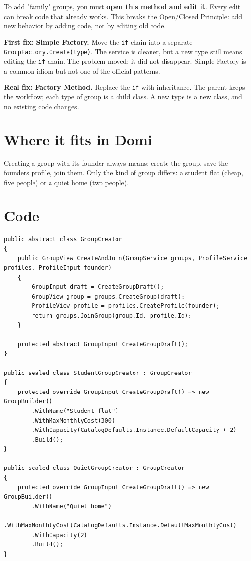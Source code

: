 \documentclass{utmreport}
\providecommand{\passthrough}[1]{#1}
\begin{document}
To add "family" groups, you must \textbf{open this method and edit it}. Every edit can break code that already works. This breaks the Open/Closed Principle: add new behavior by adding code, not by editing old code.

\textbf{First fix: Simple Factory.} Move the \passthrough{\lstinline!if!} chain into a separate \passthrough{\lstinline!GroupFactory.Create(type)!}. The service is cleaner, but a new type still means editing the \passthrough{\lstinline!if!} chain. The problem moved; it did not disappear. Simple Factory is a common idiom but not one of the official patterns.

\textbf{Real fix: Factory Method.} Replace the \passthrough{\lstinline!if!} with inheritance. The parent keeps the workflow; each type of group is a child class. A new type is a new class, and no existing code changes.

\section{Where it fits in Domi}

Creating a group with its founder always means: create the group, save the founder\textquotesingle s profile, join them. Only the kind of group differs: a student flat (cheap, five people) or a quiet home (two people).

\section{Code}

\begin{lstlisting}
public abstract class GroupCreator
{
    public GroupView CreateAndJoin(GroupService groups, ProfileService profiles, ProfileInput founder)
    {
        GroupInput draft = CreateGroupDraft();
        GroupView group = groups.CreateGroup(draft);
        ProfileView profile = profiles.CreateProfile(founder);
        return groups.JoinGroup(group.Id, profile.Id);
    }

    protected abstract GroupInput CreateGroupDraft();
}

public sealed class StudentGroupCreator : GroupCreator
{
    protected override GroupInput CreateGroupDraft() => new GroupBuilder()
        .WithName("Student flat")
        .WithMaxMonthlyCost(300)
        .WithCapacity(CatalogDefaults.Instance.DefaultCapacity + 2)
        .Build();
}

public sealed class QuietGroupCreator : GroupCreator
{
    protected override GroupInput CreateGroupDraft() => new GroupBuilder()
        .WithName("Quiet home")
        .WithMaxMonthlyCost(CatalogDefaults.Instance.DefaultMaxMonthlyCost)
        .WithCapacity(2)
        .Build();
}
\end{lstlisting}
\end{document}
